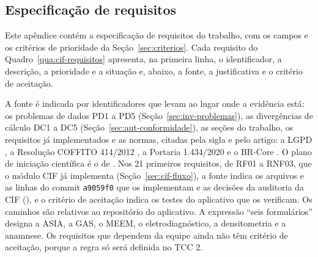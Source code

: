 \begin{apendicesenv}

\partapendices

\chapter{Especificação de requisitos}
\label{ap:requisitos}

Este apêndice contém a especificação de requisitos do trabalho, com os campos e os critérios de prioridade da
Seção~\ref{sec:criterios}. Cada requisito do Quadro~\ref{qua:cif-requisitos} apresenta, na primeira linha, o
identificador, a descrição, a prioridade e a situação e, abaixo, a fonte, a justificativa e o critério de aceitação.

A fonte é indicada por identificadores que levam ao lugar onde a evidência está: os problemas de dados PD1 a PD5
(Seção~\ref{sec:inv-problemas}), as divergências de cálculo DC1 a DC5 (Seção~\ref{sec:aut-conformidade}), as seções
do trabalho, os requisitos já implementados e as normas, citadas pela sigla e pelo artigo: a LGPD \cite{lgpd2018}, a
Resolução COFFITO 414/2012 \cite{coffito414:2012}, a Portaria 1.434/2020 \cite{portaria1434:2020} e o BR-Core
\cite{brcore2026}. O plano de iniciação científica é o de . Nos 21 primeiros
requisitos, de RF01 a RNF03, que o módulo CIF já implementa (Seção~\ref{sec:cif-fluxo}), a fonte indica os arquivos
e as linhas do commit \texttt{a9059f0} que os implementam e as decisões da auditoria da CIF
(), e o critério de aceitação indica os testes do aplicativo que os verificam. Os
caminhos são relativos ao repositório do aplicativo. A expressão ``seis formulários'' designa a ASIA, a GAS, o MEEM,
o eletrodiagnóstico, a densitometria e a anamnese. Os requisitos que dependem da equipe ainda não têm critério de
aceitação, porque a regra só será definida no TCC 2.

\newcommand{\reqgrupo}[1]{\multicolumn{4}{|l|}{\textbf{#1}} \\* \hline}
\newcommand{\req}[7]{\textbf{#1} & #2 & #3 & #4 \\* \hhline{|~|---|} \noalign{\nobreak}
	& \multicolumn{3}{>{\raggedright\arraybackslash}p{\dimexpr\linewidth-1.3cm-4\tabcolsep-3\arrayrulewidth\relax}|}{%
		\textit{Fonte:} #5\newline
		\textit{Justificativa:} #6\newline
		\textit{Critério de aceitação:} #7} \\ \hline}


\end{apendicesenv}
